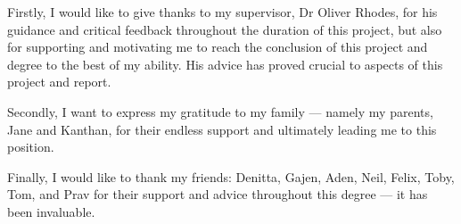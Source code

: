 Firstly, I would like to give thanks to my supervisor, Dr Oliver Rhodes,
for his guidance and critical feedback throughout the duration of this project,
but also for supporting and motivating me to reach the conclusion of this project and degree to the best of my ability.
His advice has proved crucial to aspects of this project and report.

Secondly, I want to express my gratitude to my family --- namely my parents, Jane and Kanthan, for their endless support and ultimately leading me to this position.

Finally, I would like to thank my friends: Denitta, Gajen, Aden, Neil, Felix, Toby, Tom, and Prav for their support and advice throughout this degree --- it has been invaluable.